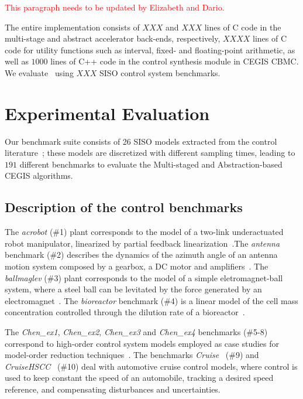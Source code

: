 \documentclass[twocolumn]{autart}    %
\begin{document}
\textcolor{red}{This paragraph needs to be updated by Elizabeth and Dario.}

The entire implementation consists of $XXX$ and $XXX$ lines of C code in the multi-stage and abstract
accelerator back-ends, respectively, $XXXX$ lines of C code for utility functions such as interval, 
fixed- and floating-point arithmetic, as well as $1000$ lines of C++ code in the control synthesis
module in CEGIS CBMC.  We evaluate \tool~using $XXX$ SISO control system
benchmarks.

\section{Experimental Evaluation}
\label{exp:evaluation}

Our benchmark suite consists of 26 SISO models extracted from the 
control literature~\cite{acrobot,cstr,CHEN1979389,KOKOTOVIC198023,gajic2008optimal,Franklin15, maglev, converters, CTMS, gajic2008optimal};
these models are discretized with different sampling times, 
leading to $191$ different benchmarks to evaluate the Multi-staged and Abstraction-based CEGIS algorithms. 

\subsection{Description of the control benchmarks}
\label{exp:benchmarks}

The \textit{acrobot} (\#1) plant corresponds to the model of a two-link 
underactuated robot manipulator, 
linearized by partial feedback linearization~\cite{acrobot}.The \textit{antenna} benchmark (\#2) 
describes the dynamics of the azimuth angle of an antenna 
motion system composed by a gearbox, a DC motor and amplifiers~\cite{gajic2008optimal}. 
The \textit{ballmaglev} (\#3) plant corresponds to the model of a simple 
eletromagnet-ball system, where a steel ball can be levitated by the force generated by an electromagnet~\cite{Franklin15}.  
The \textit{bioreactor} benchmark (\#4) is a linear model 
of the cell mass concentration controlled through the dilution rate of a bioreactor~\cite{bioreactor}.

The \textit{Chen\_ex1}, \textit{Chen\_ex2}, \textit{Chen\_ex3} and \textit{Chen\_ex4} 
benchmarks (\#5-8) correspond to high-order control system 
models employed as case studies for model-order reduction techniques~\cite{CHEN1979389}. 
The benchmarks \textit{Cruise}~\cite{Franklin15} (\#9) and \textit{CruiseHSCC}~\cite{Astrom08} (\#10) deal with 
automotive cruise control models, where control is used to keep 
constant the speed of an automobile, tracking a desired speed reference, and compensating disturbances and uncertainties. %
\end{document}
